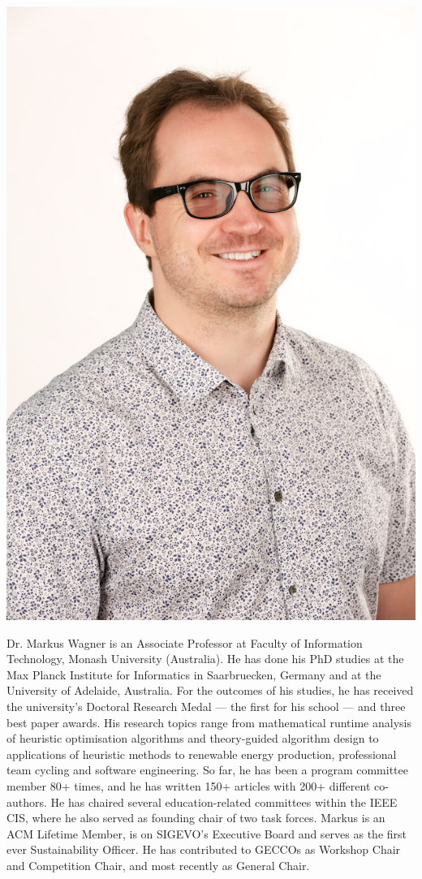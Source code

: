 \newpage
\

\vspace{3cm}
\begin{center}
\includegraphics[width=.3\textwidth]{Photos/wagner.jpg}
\end{center}

Dr. Markus Wagner is an Associate Professor at Faculty of Information Technology, Monash University (Australia). He has done his PhD studies at the Max Planck Institute for Informatics in Saarbruecken, Germany and at the University of Adelaide, Australia. For the outcomes of his studies, he has received the university's Doctoral Research Medal --- the first for his school --- and three best paper awards. His research topics range from mathematical runtime analysis of heuristic optimisation algorithms and theory-guided algorithm design to applications of heuristic methods to renewable energy production, professional team cycling and software engineering. So far, he has been a program committee member 80+ times, and he has written 150+ articles with 200+ different co-authors. He has chaired several education-related committees within the IEEE CIS, where he also served as founding chair of two task forces. Markus is an ACM Lifetime Member, is on SIGEVO's Executive Board and serves as the first ever Sustainability Officer. He has contributed to GECCOs as Workshop Chair and Competition Chair, and most recently as General Chair.

